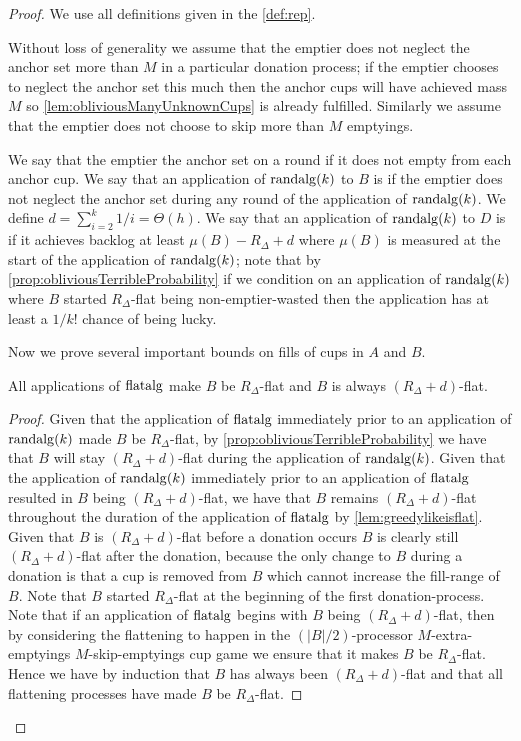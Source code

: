 \begin{proof}
  We use all definitions given in the \cref{def:rep}.

Without loss of generality we assume that the emptier does not
neglect the anchor set more than $M$ in a particular donation
process; if the emptier chooses to neglect the anchor set this
much then the anchor cups will have achieved mass $M$ so
\cref{lem:obliviousManyUnknownCups} is already fulfilled. 
Similarly we assume that the emptier does not choose to skip
more than $M$ emptyings.

We say that the emptier  the anchor set on a round
if it does not empty from each anchor cup. We say that an
application of $\operatorname{\text{\textup{randalg}}}(k)$ to $B$ is  if
the emptier does not neglect the anchor set during any round of
the application of $\operatorname{\text{\textup{randalg}}}(k)$. We define $d = \sum_{i=2}^{k} 1/i =
\Theta(h)$. We say that an application of $\operatorname{\text{\textup{randalg}}}(k)$ to $D$ is
 if it achieves backlog at least $\mu(B) - R_\Delta +
d$ where $\mu(B)$ is measured at the start of the application of
$\operatorname{\text{\textup{randalg}}}(k)$; note that by \cref{prop:obliviousTerribleProbability}
if we condition on an application of $\operatorname{\text{\textup{randalg}}}(k)$ where $B$ started
$R_\Delta$-flat being non-emptier-wasted then the application has
at least a $1/k!$ chance of being lucky.

Now we prove several important bounds on fills of cups in $A$ and $B$.
\begin{clm}
  \label{clm:allflatteningsworkbyM}
  All applications of $\operatorname{\text{\textup{flatalg}}}$ make $B$ be $R_\Delta$-flat and
  $B$ is always $(R_\Delta + d)$-flat.
\end{clm}
\begin{proof}
  Given that the application of $\operatorname{\text{\textup{flatalg}}}$ immediately prior to an application
  of $\operatorname{\text{\textup{randalg}}}(k)$ made $B$ be $R_\Delta$-flat, by
  \cref{prop:obliviousTerribleProbability} we have that $B$ will
  stay $(R_\Delta + d)$-flat during the application of $\operatorname{\text{\textup{randalg}}}(k)$. 
  Given that the application of $\operatorname{\text{\textup{randalg}}}(k)$ immediately prior to an
  application of $\operatorname{\text{\textup{flatalg}}}$ resulted in $B$ being $(R_\Delta
  + d)$-flat, we have that $B$ remains $(R_\Delta + d)$-flat
  throughout the duration of the application of $\operatorname{\text{\textup{flatalg}}}$ by
  \cref{lem:greedylikeisflat}. Given that $B$ is $(R_\Delta +
  d)$-flat before a donation occurs $B$ is clearly still $(R_\Delta +
  d)$-flat after the donation, because the only change to $B$ during
  a donation is that a cup is removed from $B$ which cannot increase
  the fill-range of $B$.
  Note that $B$ started $R_\Delta$-flat at the beginning of the
  first donation-process.
  Note that if an application of $\operatorname{\text{\textup{flatalg}}}$ begins with $B$ being
  $(R_\Delta + d)$-flat, then by considering the flattening to
  happen in the $(|B|/2)$-processor $M$-extra-emptyings
  $M$-skip-emptyings cup game we ensure that it makes $B$ be
  $R_\Delta$-flat.
  Hence we have by induction that $B$ has always been $(R_\Delta
  + d)$-flat and that all flattening processes have made $B$ be
  $R_\Delta$-flat. 
\end{proof}


\end{proof}
